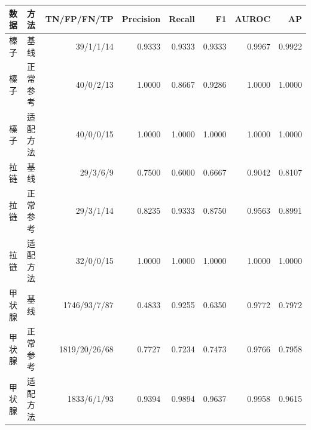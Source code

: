 \begin{tabular}{llrrrrrr}
\toprule
数据&方法&TN/FP/FN/TP&Precision&Recall&F1&AUROC&AP\\\midrule
榛子 & 基线 & 39/1/1/14 & 0.9333 & 0.9333 & 0.9333 & 0.9967 & 0.9922 \\
榛子 & 正常参考 & 40/0/2/13 & 1.0000 & 0.8667 & 0.9286 & 1.0000 & 1.0000 \\
榛子 & 适配方法 & 40/0/0/15 & 1.0000 & 1.0000 & 1.0000 & 1.0000 & 1.0000 \\
拉链 & 基线 & 29/3/6/9 & 0.7500 & 0.6000 & 0.6667 & 0.9042 & 0.8107 \\
拉链 & 正常参考 & 29/3/1/14 & 0.8235 & 0.9333 & 0.8750 & 0.9563 & 0.8991 \\
拉链 & 适配方法 & 32/0/0/15 & 1.0000 & 1.0000 & 1.0000 & 1.0000 & 1.0000 \\
甲状腺 & 基线 & 1746/93/7/87 & 0.4833 & 0.9255 & 0.6350 & 0.9772 & 0.7972 \\
甲状腺 & 正常参考 & 1819/20/26/68 & 0.7727 & 0.7234 & 0.7473 & 0.9766 & 0.7958 \\
甲状腺 & 适配方法 & 1833/6/1/93 & 0.9394 & 0.9894 & 0.9637 & 0.9958 & 0.9615 \\
\bottomrule
\end{tabular}

